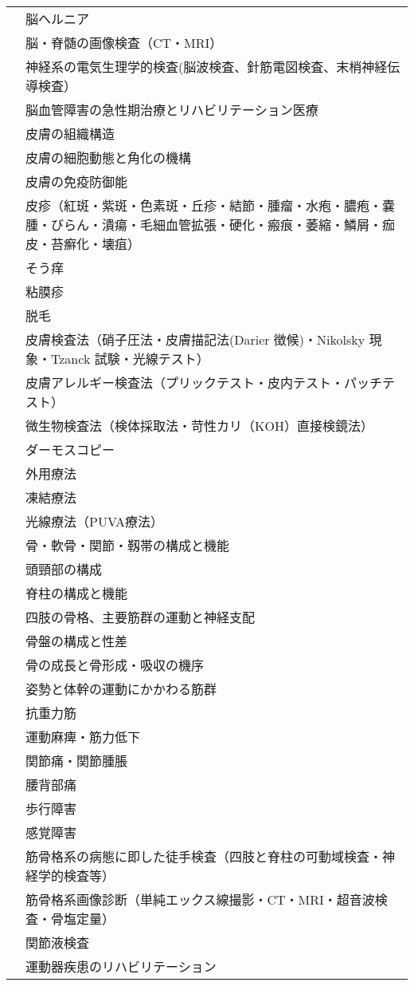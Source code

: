 \begin{xltabular}{\linewidth}{XX}
 & 脳ヘルニア \\
 & 脳・脊髄の画像検査（CT・MRI） \\
 & 神経系の電気生理学的検査(脳波検査、針筋電図検査、末梢神経伝導検査） \\
 & 脳血管障害の急性期治療とリハビリテーション医療 \\
 & 皮膚の組織構造 \\
 & 皮膚の細胞動態と角化の機構 \\
 & 皮膚の免疫防御能 \\
 & 皮疹（紅斑・紫斑・色素斑・丘疹・結節・腫瘤・水疱・膿疱・嚢腫・びらん・潰瘍・毛細血管拡張・硬化・瘢痕・萎縮・鱗屑・痂皮・苔癬化・壊疽） \\
 & そう痒 \\
 & 粘膜疹 \\
 & 脱毛 \\
 & 皮膚検査法（硝子圧法・皮膚描記法(Darier 徴候)・Nikolsky 現象・Tzanck 試験・光線テスト） \\
 & 皮膚アレルギー検査法（プリックテスト・皮内テスト・パッチテスト） \\
 & 微生物検査法（検体採取法・苛性カリ（KOH）直接検鏡法） \\
 & ダーモスコピー \\
 & 外用療法 \\
 & 凍結療法 \\
 & 光線療法（PUVA療法） \\
 & 骨・軟骨・関節・靱帯の構成と機能 \\
 & 頭頸部の構成 \\
 & 脊柱の構成と機能 \\
 & 四肢の骨格、主要筋群の運動と神経支配 \\
 & 骨盤の構成と性差 \\
 & 骨の成長と骨形成・吸収の機序 \\
 & 姿勢と体幹の運動にかかわる筋群 \\
 & 抗重力筋 \\
 & 運動麻痺・筋力低下 \\
 & 関節痛・関節腫脹 \\
 & 腰背部痛 \\
 & 歩行障害 \\
 & 感覚障害 \\
 & 筋骨格系の病態に即した徒手検査（四肢と脊柱の可動域検査・神経学的検査等） \\
 & 筋骨格系画像診断（単純エックス線撮影・CT・MRI・超音波検査・骨塩定量） \\
 & 関節液検査 \\
 & 運動器疾患のリハビリテーション \\

\end{xltabular}
